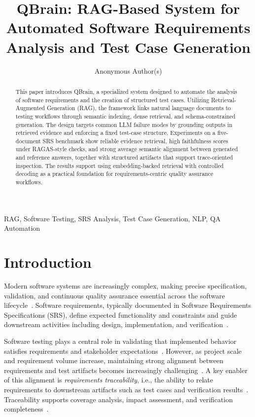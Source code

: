 \documentclass[conference]{IEEEtran}
\title{QBrain: RAG-Based System for Automated Software Requirements Analysis and Test Case Generation}
\author{Anonymous Author(s)}
\begin{document}
\maketitle

\begin{abstract}
This paper introduces QBrain, a specialized system designed to automate the analysis of software requirements and the creation of structured test cases. Utilizing Retrieval-Augmented Generation (RAG), the framework links natural language documents to testing workflows through semantic indexing, dense retrieval, and schema-constrained generation. The design targets common LLM failure modes by grounding outputs in retrieved evidence and enforcing a fixed test-case structure. Experiments on a five-document SRS benchmark show reliable evidence retrieval, high faithfulness scores under RAGAS-style checks, and strong average semantic alignment between generated and reference answers, together with structured artifacts that support trace-oriented inspection. The results support using embedding-backed retrieval with controlled decoding as a practical foundation for requirements-centric quality assurance workflows.
\end{abstract}

\begin{IEEEkeywords}
RAG, Software Testing, SRS Analysis, Test Case Generation, NLP, QA Automation
\end{IEEEkeywords}

\section{Introduction}
\label{sec:intro}

Modern software systems are increasingly complex, making precise specification, validation, and continuous quality assurance essential across the software lifecycle~\cite{sommerville2015}. Software requirements, typically documented in Software Requirements Specifications (SRS), define expected functionality and constraints and guide downstream activities including design, implementation, and verification~\cite{sommerville2015,ieee29148}.

Software testing plays a central role in validating that implemented behavior satisfies requirements and stakeholder expectations~\cite{wang2025}. However, as project scale and requirement volume increase, maintaining strong alignment between requirements and test artifacts becomes increasingly challenging~\cite{wang2025}. A key enabler of this alignment is \textit{requirements traceability}, i.e., the ability to relate requirements to downstream artifacts such as test cases and verification results~\cite{palo2003}. Traceability supports coverage analysis, impact assessment, and verification completeness~\cite{palo2003}.
\end{document}
